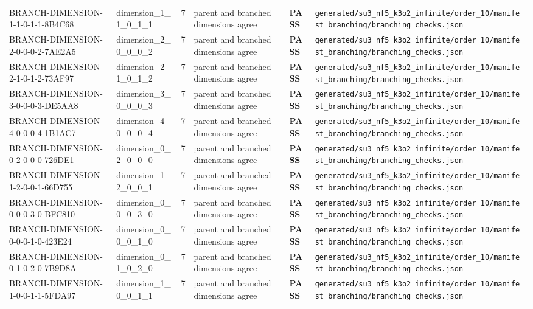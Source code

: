 \documentclass[11pt]{article}
\newcommand{\Pass}{\textcolor{green!50!black}{\textbf{PASS}}}
\newcommand{\RawPath}[1]{\texttt{#1}}
\begin{document}
\begin{longtable}{p{3cm}p{2.5cm}r p{3cm}l p{2cm}}
BRANCH-DIMENSION-1-1-0-1-1-8B4C68 & dimension\_1\_1\_0\_1\_1 & 7 & parent and branched dimensions agree & \Pass & \RawPath{generated/su3\_nf5\_k3o2\_infinite/order\_10/manifest\_branching/branching\_checks.json}\\
BRANCH-DIMENSION-2-0-0-0-2-7AE2A5 & dimension\_2\_0\_0\_0\_2 & 7 & parent and branched dimensions agree & \Pass & \RawPath{generated/su3\_nf5\_k3o2\_infinite/order\_10/manifest\_branching/branching\_checks.json}\\
BRANCH-DIMENSION-2-1-0-1-2-73AF97 & dimension\_2\_1\_0\_1\_2 & 7 & parent and branched dimensions agree & \Pass & \RawPath{generated/su3\_nf5\_k3o2\_infinite/order\_10/manifest\_branching/branching\_checks.json}\\
BRANCH-DIMENSION-3-0-0-0-3-DE5AA8 & dimension\_3\_0\_0\_0\_3 & 7 & parent and branched dimensions agree & \Pass & \RawPath{generated/su3\_nf5\_k3o2\_infinite/order\_10/manifest\_branching/branching\_checks.json}\\
BRANCH-DIMENSION-4-0-0-0-4-1B1AC7 & dimension\_4\_0\_0\_0\_4 & 7 & parent and branched dimensions agree & \Pass & \RawPath{generated/su3\_nf5\_k3o2\_infinite/order\_10/manifest\_branching/branching\_checks.json}\\
BRANCH-DIMENSION-0-2-0-0-0-726DE1 & dimension\_0\_2\_0\_0\_0 & 7 & parent and branched dimensions agree & \Pass & \RawPath{generated/su3\_nf5\_k3o2\_infinite/order\_10/manifest\_branching/branching\_checks.json}\\
BRANCH-DIMENSION-1-2-0-0-1-66D755 & dimension\_1\_2\_0\_0\_1 & 7 & parent and branched dimensions agree & \Pass & \RawPath{generated/su3\_nf5\_k3o2\_infinite/order\_10/manifest\_branching/branching\_checks.json}\\
BRANCH-DIMENSION-0-0-0-3-0-BFC810 & dimension\_0\_0\_0\_3\_0 & 7 & parent and branched dimensions agree & \Pass & \RawPath{generated/su3\_nf5\_k3o2\_infinite/order\_10/manifest\_branching/branching\_checks.json}\\
BRANCH-DIMENSION-0-0-0-1-0-423E24 & dimension\_0\_0\_0\_1\_0 & 7 & parent and branched dimensions agree & \Pass & \RawPath{generated/su3\_nf5\_k3o2\_infinite/order\_10/manifest\_branching/branching\_checks.json}\\
BRANCH-DIMENSION-0-1-0-2-0-7B9D8A & dimension\_0\_1\_0\_2\_0 & 7 & parent and branched dimensions agree & \Pass & \RawPath{generated/su3\_nf5\_k3o2\_infinite/order\_10/manifest\_branching/branching\_checks.json}\\
BRANCH-DIMENSION-1-0-0-1-1-5FDA97 & dimension\_1\_0\_0\_1\_1 & 7 & parent and branched dimensions agree & \Pass & \RawPath{generated/su3\_nf5\_k3o2\_infinite/order\_10/manifest\_branching/branching\_checks.json}\\

\end{longtable}
\end{document}
